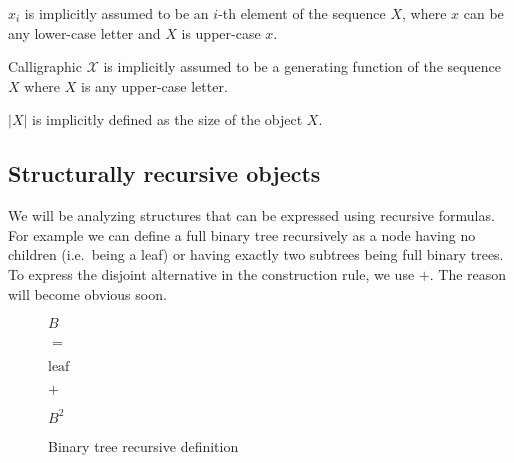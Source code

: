 \documentclass[final]{article}
\theoremstyle{definition}
\theoremstyle{definition}
\theoremstyle{remark}
\newcommand{\gf}[1]{\ensuremath{\mathcal{#1}}}
\newcommand{\size}[1]{\ensuremath{\left|#1\right|}}
\begin{document}
\(x_i\) is implicitly assumed to be an \(i\)-th element of the sequence \(X\), where \(x\) can be any lower-case letter and \(X\) is upper-case \(x\).

Calligraphic \(\gf{X}\) is implicitly assumed to be a generating function of the sequence \(X\) where \(X\) is any upper-case letter.

\(\size{X}\) is implicitly defined as the size of the object \(X\).

\subsection{Structurally recursive objects}%
\label{sub:structurally_recursive_objects}

We will be analyzing structures that can be expressed using recursive formulas. For example we can define a full binary tree recursively as a node having no children (i.e.\ being a leaf) or having exactly two subtrees being full binary trees. To express the disjoint alternative in the construction rule, we use \(+\). The reason will become obvious soon.

\begin{figure}[H]
    \begin{center}
        \begin{minipage}[t]{.2\textwidth}
            \begin{center}
                \(B\)\\
            \end{center}
        \end{minipage}%
        \begin{minipage}[t]{.05\textwidth}
            \begin{center}
                \(=\)\\
            \end{center}
        \end{minipage}%
        \begin{minipage}[t]{.2\textwidth}
            \begin{center}
                \(\text{leaf}\)\\
            \end{center}
        \end{minipage}%
        \begin{minipage}[t]{.05\textwidth}
            \begin{center}
                \(+\)\\
            \end{center}
        \end{minipage}%
        \begin{minipage}[t]{.2\textwidth}
            \begin{center}
                \(B^2\)\\
            \end{center}
        \end{minipage}%
    \end{center}
    \caption{Binary tree recursive definition}
    \label{fig:binary_recursion}
\end{figure}
\end{document}
